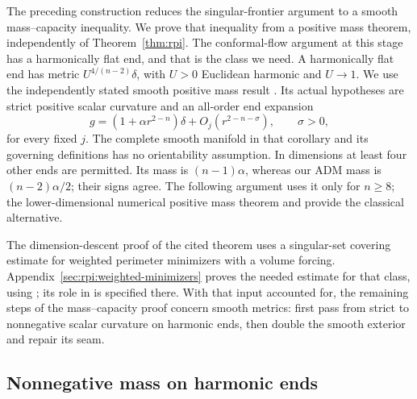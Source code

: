 The preceding construction reduces the singular-frontier argument
to a smooth mass--capacity inequality. We prove that inequality
from a positive mass theorem, independently of
Theorem~\ref{thm:rpi}. The conformal-flow argument at this stage
has a harmonically flat end, and that is the class we need. A harmonically flat
end has metric $U^{4/(n-2)}\delta$, with $U>0$ Euclidean harmonic and
$U\to1$. We use the independently stated smooth positive mass result
\cite[Corollary~1.6]{BrendleWang2026}. Its actual hypotheses are strict
positive scalar curvature and an all-order end expansion
\begin{equation}\label{eq:rpi:bw-end}
 g=(1+\alpha r^{2-n})\delta+O_j(r^{2-n-\sigma}),\qquad \sigma>0,
\end{equation}
for every fixed $j$. The complete smooth manifold in that corollary
and its governing definitions has no orientability assumption. In
dimensions at least four other ends are permitted. Its mass is
$(n-1)\alpha$, whereas our ADM mass is
$(n-2)\alpha/2$; their signs agree. The following argument uses it only
for $n\ge8$; the lower-dimensional numerical positive mass theorem
and \cite{BrayLee2009} provide the classical alternative.

The dimension-descent proof of the cited theorem uses a singular-set
covering estimate for weighted perimeter minimizers with a volume
forcing. Appendix~\ref{sec:rpi:weighted-minimizers} proves the
needed estimate for that class, using
\cite[Theorem~1.3]{NaberValtorta2020}; its role in
\cite[Definition~3.19, Lemma~3.20, and Theorem~3.34]{BrendleWang2026}
is specified there. With that input accounted for, the remaining
steps of the mass--capacity proof concern smooth metrics: first
pass from strict to nonnegative scalar curvature on harmonic ends,
then double the smooth exterior and repair its seam.

\subsection{Nonnegative mass on harmonic ends}

